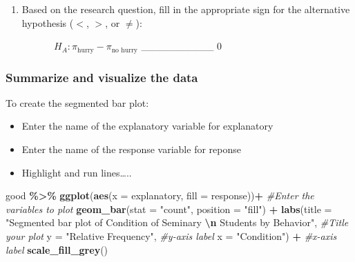 \documentclass[
]{report}
\newenvironment{Shaded}{\begin{snugshade}}{\end{snugshade}}
\newcommand{\AttributeTok}[1]{\textcolor[rgb]{0.13,0.29,0.53}{#1}}
\newcommand{\CommentTok}[1]{\textcolor[rgb]{0.56,0.35,0.01}{\textit{#1}}}
\newcommand{\FunctionTok}[1]{\textcolor[rgb]{0.13,0.29,0.53}{\textbf{#1}}}
\newcommand{\NormalTok}[1]{#1}
\newcommand{\SpecialCharTok}[1]{\textcolor[rgb]{0.81,0.36,0.00}{\textbf{#1}}}
\newcommand{\StringTok}[1]{\textcolor[rgb]{0.31,0.60,0.02}{#1}}
\providecommand{\tightlist}{%
  \setlength{\itemsep}{0pt}\setlength{\parskip}{0pt}}
\begin{document}
\vspace{0.4in}

\begin{enumerate}
\def\labelenumi{\arabic{enumi}.}
\setcounter{enumi}{1}
\tightlist
\item
  Based on the research question, fill in the appropriate sign for the alternative hypothesis (\(<\), \(>\), or \(\neq\)):
  \vspace{2mm}
\end{enumerate}

~~~~~~~~~~\(H_A: \pi_{\text{hurry}} -\pi_{\text{no hurry}}\) \_\_\_\_\_\_\_\_\_\_ 0

\subsubsection*{Summarize and visualize the data}\label{summarize-and-visualize-the-data-2}

To create the segmented bar plot:

\begin{itemize}
\item
  Enter the name of the explanatory variable for explanatory
\item
  Enter the name of the response variable for reponse
\item
  Highlight and run lines\ldots..
\end{itemize}

\begin{Shaded}
\begin{Highlighting}[]
\NormalTok{good }\SpecialCharTok{\%\textgreater{}\%}
  \FunctionTok{ggplot}\NormalTok{(}\FunctionTok{aes}\NormalTok{(}\AttributeTok{x =}\NormalTok{ explanatory, }\AttributeTok{fill =}\NormalTok{ response))}\SpecialCharTok{+} \CommentTok{\#Enter the variables to plot}
  \FunctionTok{geom\_bar}\NormalTok{(}\AttributeTok{stat =} \StringTok{"count"}\NormalTok{, }\AttributeTok{position =} \StringTok{"fill"}\NormalTok{) }\SpecialCharTok{+}
  \FunctionTok{labs}\NormalTok{(}\AttributeTok{title =} \StringTok{"Segmented bar plot of Condition of Seminary }\SpecialCharTok{\textbackslash{}n}\StringTok{ Students by Behavior"}\NormalTok{, }\CommentTok{\#Title your plot}
       \AttributeTok{y =} \StringTok{"Relative Frequency"}\NormalTok{, }\CommentTok{\#y{-}axis label}
       \AttributeTok{x =} \StringTok{"Condition"}\NormalTok{) }\SpecialCharTok{+} \CommentTok{\#x{-}axis label}
  \FunctionTok{scale\_fill\_grey}\NormalTok{()}
\end{Highlighting}
\end{Shaded}
\end{document}
